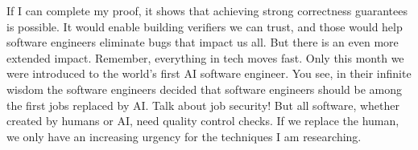 If I can complete my proof, it shows that achieving strong correctness guarantees is possible. It would enable building verifiers we can trust, and those would help software engineers eliminate bugs that impact us all. But there is an even more extended impact. Remember, everything in tech moves fast. Only this month we were introduced to the world’s first AI software engineer. You see, in their infinite wisdom the software engineers decided that software engineers should be among the first jobs replaced by AI. Talk about job security! But all software, whether created by humans or AI, need quality control checks. If we replace the human, we only have an increasing urgency for the techniques I am researching.

